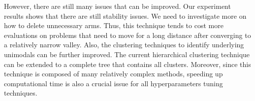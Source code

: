 However, there are still many issues that can be improved.
Our experiment results shows that there are still stability issues.
We need to investigate more on how to delete unnecessary arms.
Thus, this technique tends to cost more evaluations on problems 
that need to move for a long distance after converging to a relatively narrow valley.
Also, the clustering techniques to identify underlying unimodals can be further improved.
The current hierarchical clustering technique can be extended to a complete tree that contains all clusters.
Moreover, since this technique is composed of many relatively complex methods, 
speeding up computational time is also a crucial issue for all hyperparameters tuning techniques.



